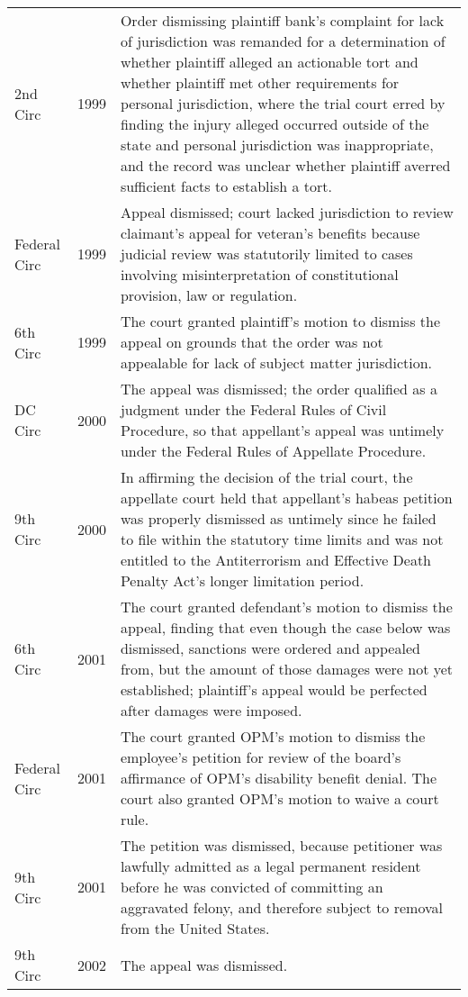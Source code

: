 \documentclass[10pt, letterpaper]{article}
\begin{document}
\begin{spacing}{1.0}
\begin{small}
\begin{longtable}[H]{llp{5in}}
    2nd Circ & 1999 & Order dismissing plaintiff bank's complaint for lack of jurisdiction was remanded for a determination of whether plaintiff alleged an actionable tort and whether plaintiff met other requirements for personal jurisdiction, where the trial court erred by finding the injury alleged occurred outside of the state and personal jurisdiction was inappropriate, and the record was unclear whether plaintiff averred sufficient facts to establish a tort.\\[4pt]
    Federal Circ & 1999 & Appeal dismissed; court lacked jurisdiction to review claimant's appeal for veteran's benefits because judicial review was statutorily limited to cases involving misinterpretation of constitutional provision, law or regulation.\\[4pt]
    6th Circ & 1999 & The court granted plaintiff's motion to dismiss the appeal on grounds that the order was not appealable for lack of subject matter jurisdiction.\\[4pt]
    DC Circ & 2000 & The appeal was dismissed; the order qualified as a judgment under the Federal Rules of Civil Procedure, so that appellant's appeal was untimely under the Federal Rules of Appellate Procedure.\\[4pt]
    9th Circ & 2000 & In affirming the decision of the trial court, the appellate court held that appellant's habeas petition was properly dismissed as untimely since he failed to file within the statutory time limits and was not entitled to the Antiterrorism and Effective Death Penalty Act's longer limitation period.\\[4pt]
    6th Circ & 2001 & The court granted defendant's motion to dismiss the appeal, finding that even though the case below was dismissed, sanctions were ordered and appealed from, but the amount of those damages were not yet established; plaintiff's appeal would be perfected after damages were imposed.\\[4pt]
    Federal Circ & 2001 & The court granted OPM's motion to dismiss the employee's petition for review of the board's affirmance of OPM's disability benefit denial. The court also granted OPM's motion to waive a court rule.\\[4pt]
    9th Circ & 2001 & The petition was dismissed, because petitioner was lawfully admitted as a legal permanent resident before he was convicted of committing an aggravated felony, and therefore subject to removal from the United States.\\[4pt]
    9th Circ & 2002 & The appeal was dismissed.\\[4pt]

\end{longtable}
\end{small}
\end{spacing}
\end{document}
